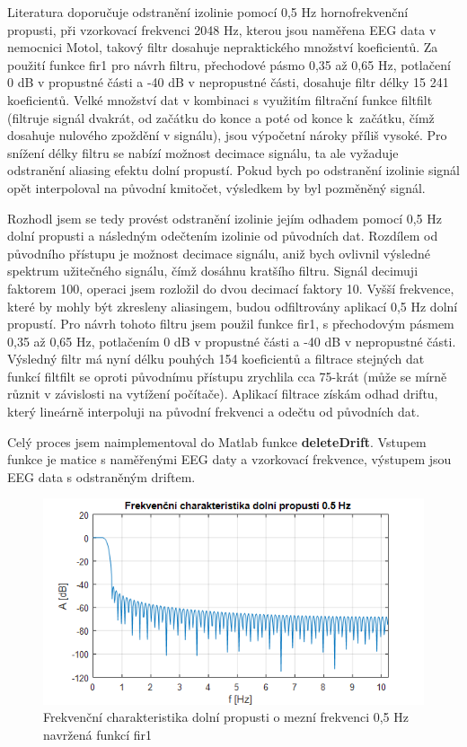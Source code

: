 Literatura doporučuje odstranění izolinie pomocí 0,5 Hz hornofrekvenční propusti, při vzorkovací frekvenci 2048 Hz, kterou jsou naměřena EEG data v nemocnici Motol, takový filtr dosahuje nepraktického množství koeficientů. Za použití funkce fir1 pro návrh filtru, přechodové pásmo 0,35 až 0,65 Hz, potlačení 0 dB v propustné části a -40 dB v nepropustné části, dosahuje filtr délky 15 241 koeficientů. Velké množství dat v kombinaci s využitím filtrační funkce filtfilt (filtruje signál dvakrát, od začátku do konce a poté od konce k~začátku, čímž dosahuje nulového zpoždění v signálu), jsou výpočetní nároky příliš vysoké. Pro snížení délky filtru se nabízí možnost decimace signálu, ta ale vyžaduje odstranění aliasing efektu dolní propustí. Pokud bych po odstranění izolinie signál opět interpoloval na původní kmitočet, výsledkem by byl pozměněný signál.

Rozhodl jsem se tedy provést odstranění izolinie jejím odhadem pomocí 0,5 Hz dolní propusti a následným odečtením izolinie od původních dat. Rozdílem od původního přístupu je možnost decimace signálu, aniž bych ovlivnil výsledné spektrum užitečného signálu, čímž dosáhnu kratšího filtru. Signál decimuji faktorem 100, operaci jsem rozložil do dvou decimací faktory 10. Vyšší frekvence, které by mohly být zkresleny aliasingem, budou odfiltrovány aplikací 0,5 Hz dolní propustí. Pro návrh tohoto filtru jsem použil funkce fir1, s přechodovým pásmem 0,35 až 0,65 Hz, potlačením 0 dB v propustné části a -40 dB v nepropustné části. Výsledný filtr má nyní délku pouhých 154 koeficientů a filtrace stejných dat funkcí filtfilt se oproti původnímu přístupu zrychlila cca 75-krát (může se mírně různit v závislosti na vytížení počítače). Aplikací filtrace získám odhad driftu, který lineárně interpoluji na původní frekvenci a odečtu od původních dat.

Celý proces jsem naimplementoval do Matlab funkce \textbf{deleteDrift}. Vstupem funkce je matice s naměřenými EEG daty a vzorkovací frekvence, výstupem jsou EEG data s odstraněným driftem.

\begin{figure}[!h]
\includegraphics[width=1.0\textwidth]{casti/implementace/izolinie/charakteristika.png}
\caption{Frekvenční charakteristika dolní propusti o mezní frekvenci 0,5 Hz navržená funkcí fir1}
\end{figure}

